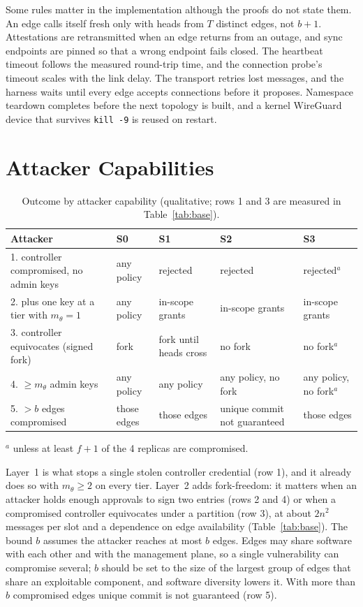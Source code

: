 \documentclass[conference]{IEEEtran}
\begin{document}
Some rules matter in the implementation although the proofs do not state them. An edge calls itself fresh only with heads from $T$ distinct edges, not $b{+}1$. Attestations are retransmitted when an edge returns from an outage, and sync endpoints are pinned so that a wrong endpoint fails closed. The heartbeat timeout follows the measured round-trip time, and the connection probe's timeout scales with the link delay. The transport retries lost messages, and the harness waits until every edge accepts connections before it proposes. Namespace teardown completes before the next topology is built, and a kernel WireGuard device that survives \texttt{kill -9} is reused on restart.

\section{Attacker Capabilities}\label{sec:threat}
\begin{table}[t]
\centering\caption{Outcome by attacker capability (qualitative; rows 1 and 3 are measured in Table~\ref{tab:base}).}\label{tab:threat}
\scriptsize\setlength{\tabcolsep}{3pt}
\begin{tabular}{@{}p{2.2cm}p{1.1cm}p{1.4cm}p{1.5cm}p{1.3cm}@{}}
\toprule
Attacker & S0 & S1 & S2 & S3\\
\midrule
1. controller compromised, no admin keys & any policy & rejected & rejected & rejected$^a$\\
2. plus one key at a tier with $m_\theta{=}1$ & any policy & in-scope grants & in-scope grants & in-scope grants\\
3. controller equivocates (signed fork) & fork & fork until heads cross & no fork & no fork$^a$\\
4. $\ge m_\theta$ admin keys & any policy & any policy & any policy, no fork & any policy, no fork$^a$\\
5. $>b$ edges compromised & those edges & those edges & unique commit not guaranteed & those edges\\
\bottomrule
\end{tabular}

\raggedright\scriptsize $^a$ unless at least $f{+}1$ of the 4 replicas are compromised.
\end{table}
Layer~1 is what stops a single stolen controller credential (row 1), and it already does so with $m_\theta\ge2$ on every tier. Layer~2 adds fork-freedom: it matters when an attacker holds enough approvals to sign two entries (rows 2 and 4) or when a compromised controller equivocates under a partition (row 3), at about $2n^2$ messages per slot and a dependence on edge availability (Table~\ref{tab:base}). The bound $b$ assumes the attacker reaches at most $b$ edges. Edges may share software with each other and with the management plane, so a single vulnerability can compromise several; $b$ should be set to the size of the largest group of edges that share an exploitable component, and software diversity lowers it. With more than $b$ compromised edges unique commit is not guaranteed (row 5).
\end{document}
